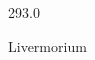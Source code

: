 \documentclass[12pt]{article}
\begin{document}
\hfill{}
\vfill
\begin{center}
  {\fontsize{50}{60}
  }

  \vspace{1em}

  293.0

Livermorium
\end{center}
\vfill
\end{document}
